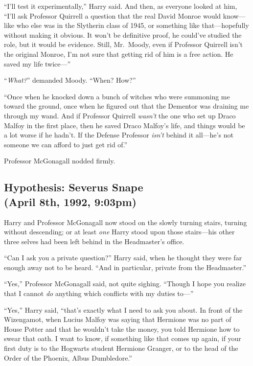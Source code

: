 “I’ll test it experimentally,” Harry said. And then, as everyone looked at him, “I’ll ask Professor Quirrell a question that the real David Monroe would know—like who else was in the Slytherin class of 1945, or something like that—hopefully without making it obvious. It won’t be definitive proof, he could’ve studied the role, but it would be evidence. Still, Mr.~Moody, even if Professor Quirrell isn’t the original Monroe, I’m not sure that getting rid of him is a free action. He saved my life twice—”

“\emph{What?}” demanded Moody. “When? How?”

“Once when he knocked down a bunch of witches who were summoning me toward the ground, once when he figured out that the Dementor was draining me through my wand. And if Professor Quirrell \emph{wasn’t} the one who set up Draco Malfoy in the first place, then he saved Draco Malfoy’s life, and things would be a lot worse if he hadn’t. If the Defense Professor \emph{isn’t} behind it all—he’s not someone we can afford to just get rid of.”

Professor McGonagall nodded firmly.
\sbreak

\subsection{Hypothesis: Severus Snape\\(April 8th, 1992, 9:03pm)}
\sbreak

Harry and Professor McGonagall now stood on the slowly turning stairs, turning without descending; or at least \emph{one} Harry stood upon those stairs—his other three selves had been left behind in the Headmaster’s office.

“Can I ask you a private question?” Harry said, when he thought they were far enough away not to be heard. “And in particular, private from the Headmaster.”

“Yes,” Professor McGonagall said, not quite sighing. “Though I hope you realize that I cannot \emph{do} anything which conflicts with my duties to—”

“Yes,” Harry said, “that’s exactly what I need to ask you about. In front of the Wizengamot, when Lucius Malfoy was saying that Hermione was no part of House Potter and that he wouldn’t take the money, you told Hermione how to swear that oath. I want to know, if something like that comes up again, if your first duty is to the Hogwarts student Hermione Granger, or to the head of the Order of the Phoenix, Albus Dumbledore.”

